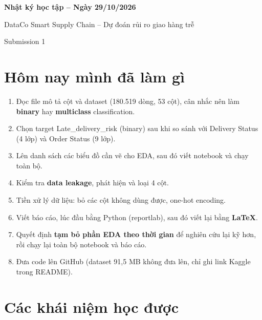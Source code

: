 \documentclass[11pt,a4paper]{article}
\newcommand{\col}[1]{\textsf{#1}}
\begin{document}
\begin{center}
{\LARGE\bfseries Nhật ký học tập -- Ngày 29/10/2026\par}
\vspace{0.2cm}
{\large DataCo Smart Supply Chain -- Dự đoán rủi ro giao hàng trễ\par}
\vspace{0.2cm}
{\small Submission 1\par}
\end{center}
\vspace{0.3cm}

\tableofcontents

\section{Hôm nay mình đã làm gì}
\begin{enumerate}
  \item Đọc file mô tả cột và dataset (180.519 dòng, 53 cột), cân nhắc nên làm \textbf{binary} hay \textbf{multiclass} classification.
  \item Chọn target \col{Late\_delivery\_risk} (binary) sau khi so sánh với \col{Delivery Status} (4 lớp) và \col{Order Status} (9 lớp).
  \item Lên danh sách các biểu đồ cần vẽ cho EDA, sau đó viết notebook và chạy toàn bộ.
  \item Kiểm tra \textbf{data leakage}, phát hiện và loại 4 cột.
  \item Tiền xử lý dữ liệu: bỏ các cột không dùng được, one-hot encoding.
  \item Viết báo cáo, lúc đầu bằng Python (reportlab), sau đó viết lại bằng \textbf{LaTeX}.
  \item Quyết định \textbf{tạm bỏ phần EDA theo thời gian} để nghiên cứu lại kỹ hơn, rồi chạy lại toàn bộ notebook và báo cáo.
  \item Đưa code lên GitHub (dataset 91,5 MB không đưa lên, chỉ ghi link Kaggle trong README).
\end{enumerate}

\section{Các khái niệm học được}
\end{document}
